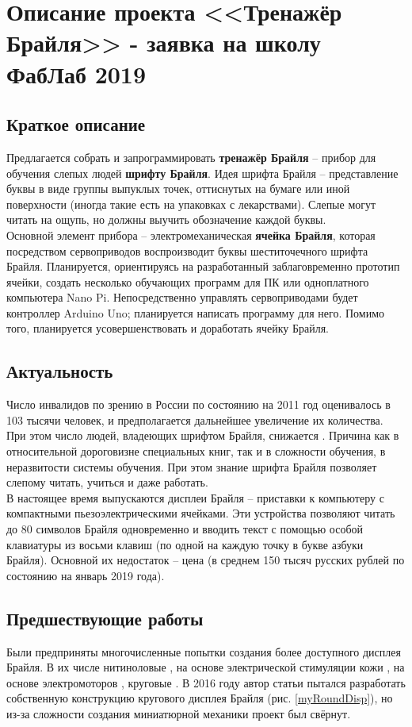 \documentclass[a4paper,12pt]{article} %
\begin{document}
\section{Описание проекта <<Тренажёр Брайля>>  - заявка на школу ФабЛаб 2019}
\subsection{Краткое описание}
Предлагается собрать и запрограммировать \textbf{тренажёр Брайля} -- прибор для обучения слепых людей \textbf{шрифту Брайля}. Идея шрифта Брайля -- представление буквы в виде группы выпуклых точек, оттиснутых на бумаге или иной поверхности (иногда такие есть на упаковках с лекарствами). Слепые могут читать на ощупь, но должны выучить обозначение каждой буквы.\\
Основной элемент прибора -- электромеханическая \textbf{ячейка Брайля}, которая посредством сервоприводов воспроизводит буквы шеститочечного шрифта Брайля. Планируется, ориентируясь на разработанный заблаговременно прототип ячейки, создать несколько обучающих программ для ПК или одноплатного компьютера Nano Pi. Непосредственно управлять сервоприводами будет контроллер Arduino Uno; планируется написать программу для него. Помимо того, планируется усовершенствовать и доработать ячейку Брайля.

\subsection{Актуальность}
Число инвалидов по зрению в России по состоянию на 2011 год оценивалось в 103 тысячи человек, и предполагается дальнейшее увеличение их количества\cite{stat}. При этом число людей, владеющих шрифтом Брайля, снижается \cite{brailleLower}. Причина как в относительной дороговизне специальных книг, так и в сложности обучения, в неразвитости системы обучения. При этом знание шрифта Брайля позволяет слепому читать, учиться и даже работать.\\
В настоящее время выпускаются дисплеи Брайля -- приставки к компьютеру с компактными пьезоэлектрическими ячейками. Эти устройства позволяют читать до 80 символов Брайля одновременно и вводить текст с помощью особой клавиатуры из восьми клавиш (по одной на каждую точку в букве азбуки Брайля). Основной их недостаток -- цена (в среднем 150 тысяч русских рублей по состоянию на январь 2019 года).

\subsection{Предшествующие работы}
Были предприняты многочисленные попытки создания более доступного дисплея Брайля.  В их числе нитиноловые \cite{sma}, на основе электрической стимуляции кожи \cite{kaji1} \cite{kaji2}, на основе электромоторов \cite{bristol}, круговые \cite{rotDisp}. В 2016 году автор статьи пытался разработать собственную конструкцию кругового дисплея Брайля (рис. \ref{myRoundDisp}), но из-за сложности создания миниатюрной механики проект был свёрнут.\\
\end{document}
